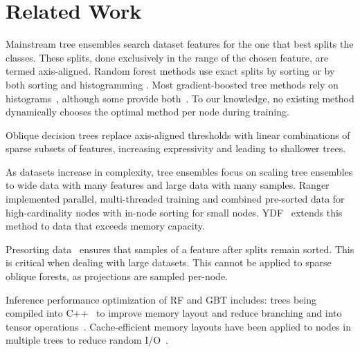 \documentclass[sigconf,anonymous,review]{acmart}
\begin{document}
\section{Related Work}



Mainstream tree ensembles search dataset features for the one that best splits the classes. These splits, done exclusively in the range of the chosen feature, are termed axis-aligned. Random forest methods use exact splits by sorting \cite{wright2017ranger} or by both sorting and histogramming \cite{ydf,pedregosa2011scikit}. Most gradient-boosted tree methods rely on histograms~\cite{prokhorenkova2018catboost,ponomareva2017tf,ke2017lightgbm,wenthundergbm19,rapids},
although some provide both~\cite{pedregosa2011scikit,chen2016xgboost,wenthundergbm19}. To our knowledge, no existing method dynamically chooses the optimal method per node during training.

Oblique decision trees replace axis-aligned thresholds with linear combinations of sparse subsets of features, increasing expressivity and leading to shallower trees.



    As datasets increase in complexity, tree ensembles focus on scaling tree ensembles to wide data with many features and large data with many samples. Ranger~\cite{wright2017ranger} implemented parallel, multi-threaded training and combined pre-sorted data for high-cardinality nodes with in-node sorting for small nodes. YDF~\cite{ydf} extends this method to data that exceeds memory capacity.


    Presorting data~\cite{ydf,pedregosa2011scikit,chen2016xgboost,wenthundergbm19} ensures that samples of a feature after splits remain sorted. This is critical when dealing with large datasets. This cannot be applied to sparse oblique forests, as projections are sampled per-node.

Inference performance optimization of RF and GBT includes: trees being compiled into C++~\cite{cho2018treelite,rapids} to improve memory layout and reduce branching and into tensor operations~\cite{nakandala2020tensor}. Cache-efficient memory layouts have been applied to nodes in multiple trees to reduce random I/O~\cite{browne2022forestpacking,madhyastha2021blockset}.
\end{document}
